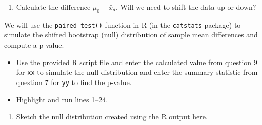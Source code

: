 \documentclass[
]{report}
\newenvironment{Shaded}{\begin{snugshade}}{\end{snugshade}}
\newcommand{\AttributeTok}[1]{\textcolor[rgb]{0.13,0.29,0.53}{#1}}
\newcommand{\CommentTok}[1]{\textcolor[rgb]{0.56,0.35,0.01}{\textit{#1}}}
\newcommand{\DecValTok}[1]{\textcolor[rgb]{0.00,0.00,0.81}{#1}}
\newcommand{\FunctionTok}[1]{\textcolor[rgb]{0.13,0.29,0.53}{\textbf{#1}}}
\newcommand{\NormalTok}[1]{#1}
\newcommand{\SpecialCharTok}[1]{\textcolor[rgb]{0.81,0.36,0.00}{\textbf{#1}}}
\newcommand{\StringTok}[1]{\textcolor[rgb]{0.31,0.60,0.02}{#1}}
\providecommand{\tightlist}{%
  \setlength{\itemsep}{0pt}\setlength{\parskip}{0pt}}
\begin{document}
\begin{enumerate}
\def\labelenumi{\arabic{enumi}.}
\setcounter{enumi}{8}
\tightlist
\item
  Calculate the difference \(\mu_0 - \bar{x}_d\). Will we need to shift the data up or down?
\end{enumerate}

\vspace{.7in}

We will use the \texttt{paired\_test()} function in R (in the \texttt{catstats} package) to simulate the shifted bootstrap (null) distribution of sample mean differences and compute a p-value.

\begin{itemize}
\item
  Use the provided R script file and enter the calculated value from question 9 for \texttt{xx} to simulate the null distribution and enter the summary statistic from question 7 for \texttt{yy} to find the p-value.
\item
  Highlight and run lines 1--24.
\end{itemize}

\begin{Shaded}
\end{Shaded}

\begin{enumerate}
\def\labelenumi{\arabic{enumi}.}
\setcounter{enumi}{9}
\tightlist
\item
  Sketch the null distribution created using the R output here.
\end{enumerate}
\end{document}

